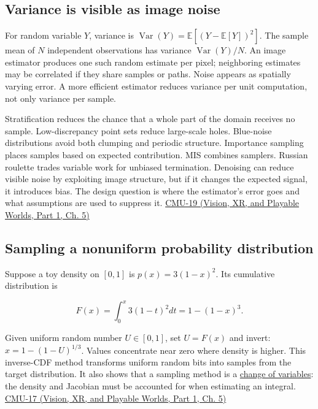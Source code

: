 \subsection{Variance is visible as image noise}\label{03-visual-computing-i-ch012-variance-is-visible-as-image-noise}

\hypertarget{03-visual-computing-i-ch012-variance-is-visible-as-image-noise}{}

For random variable \(Y\), variance is \(\operatorname{Var}(Y)=\mathbb E[(Y-\mathbb E[Y])^2]\). The sample mean of \(N\) independent observations has variance \(\operatorname{Var}(Y)/N\). An image estimator produces one such random estimate per pixel; neighboring estimates may be correlated if they share samples or paths. Noise appears as spatially varying error. A more efficient estimator reduces variance per unit computation, not only variance per sample.

Stratification reduces the chance that a whole part of the domain receives no sample. Low-discrepancy point sets reduce large-scale holes. Blue-noise distributions avoid both clumping and periodic structure. Importance sampling places samples based on expected contribution. MIS combines samplers. Russian roulette trades variable work for unbiased termination. Denoising can reduce visible noise by exploiting image structure, but if it changes the expected signal, it introduces bias. The design question is where the estimator's error goes and what assumptions are used to suppress it. \href{../07-Vision-XR-and-Playable-Worlds-P01/main.pdf\#04-visual-computing-ii-ch036-cmu-19---variance-reduction}{CMU-19 (Vision, XR, and Playable Worlds, Part 1, Ch. 5)}

\subsection{Sampling a nonuniform probability distribution}\label{03-visual-computing-i-ch012-sampling-a-nonuniform-probability-distribution}

\hypertarget{03-visual-computing-i-ch012-sampling-a-nonuniform-probability-distribution}{}

Suppose a toy density on \([0,1]\) is \(p(x)=3(1-x)^2\). Its cumulative distribution is

\[
F(x)=\int_0^x3(1-t)^2dt=1-(1-x)^3.
\]

Given uniform random number \(U\in[0,1]\), set \(U=F(x)\) and invert: \(x=1-(1-U)^{1/3}\). Values concentrate near zero where density is higher. This inverse-CDF method transforms uniform random bits into samples from the target distribution. It also shows that a sampling method is a \hyperref[appendix-4815cd87ab8b]{change of variables}: the density and Jacobian must be accounted for when estimating an integral. \href{../07-Vision-XR-and-Playable-Worlds-P01/main.pdf\#04-visual-computing-ii-ch036-cmu-17---numerical-integration}{CMU-17 (Vision, XR, and Playable Worlds, Part 1, Ch. 5)}

